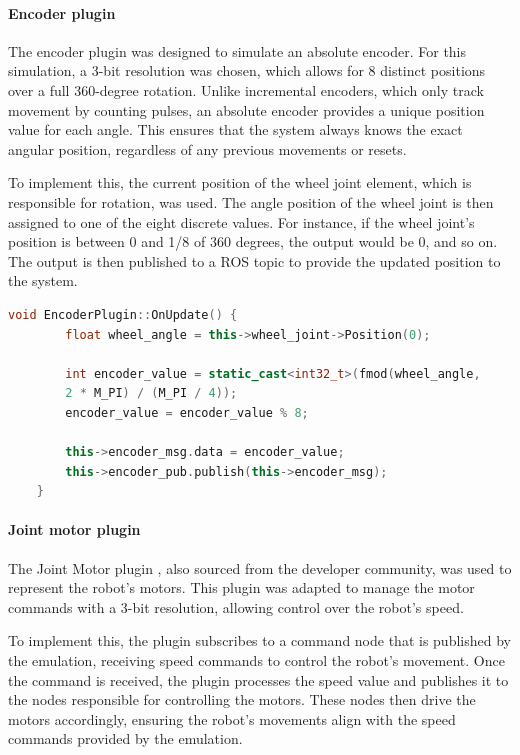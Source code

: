 \documentclass[../../monografia.tex]{subfiles}
\begin{document}
\paragraph{Encoder plugin}
The encoder plugin was designed to simulate an absolute encoder. For this simulation, a 3-bit resolution was chosen, which allows for 8 distinct positions over a full 360-degree rotation. Unlike incremental encoders, which only track movement by counting pulses, an absolute encoder provides a unique position value for each angle. This ensures that the system always knows the exact angular position, regardless of any previous movements or resets.

To implement this, the current position of the wheel joint element, which is responsible for rotation, was used. The angle position of the wheel joint is then assigned to one of the eight discrete values. For instance, if the wheel joint’s position is between 0 and 1/8 of 360 degrees, the output would be 0, and so on. The output is then published to a ROS topic to provide the updated position to the system.

\begin{lstlisting}[language=C++, caption={Encoder plugin position update function}]
void EncoderPlugin::OnUpdate() {
        float wheel_angle = this->wheel_joint->Position(0);

        int encoder_value = static_cast<int32_t>(fmod(wheel_angle,
        2 * M_PI) / (M_PI / 4));
        encoder_value = encoder_value % 8;

        this->encoder_msg.data = encoder_value;
        this->encoder_pub.publish(this->encoder_msg);
    }
\end{lstlisting}

\paragraph{Joint motor plugin}

The Joint Motor plugin \cite{Gazebo_ROS_Motors_23}, also sourced from the developer community, was used to represent the robot’s motors. This plugin was adapted to manage the motor commands with a 3-bit resolution, allowing control over the robot’s speed.

To implement this, the plugin subscribes to a command node that is published by the emulation, receiving speed commands to control the robot's movement. Once the command is received, the plugin processes the speed value and publishes it to the nodes responsible for controlling the motors. These nodes then drive the motors accordingly, ensuring the robot's movements align with the speed commands provided by the emulation.
\end{document}
